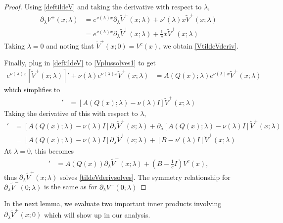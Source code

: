 \documentclass[thesis.tex]{subfiles}
\begin{document}
\begin{lemma}
\begin{proof}
Using \cref{deftildeV} and taking the derivative with respect to $\lambda$,
\begin{align*}
\partial_\lambda V^+(x; \lambda)
&= e^{\nu(\lambda)x} \partial_\lambda \tilde{V}^+(x; \lambda) + \nu'(\lambda)x \tilde{V}^+(x; \lambda) \\
&= e^{\nu(\lambda)x} \partial_\lambda \tilde{V}^+(x; \lambda) + \frac{1}{c} x \tilde{V}^+(x; \lambda) 
\end{align*}
Taking $\lambda = 0$ and noting that $\tilde{V}^+(x; 0) = V^c(x)$, we obtain \cref{VtildeVderiv}.

Finally, plug in \cref{deftildeV} to \cref{Vplussolves1} to get
\begin{align*}
e^{\nu(\lambda)x} [\tilde{V}^+(x; \lambda)]' + \nu(\lambda) e^{\nu(\lambda)x} \tilde{V}^+(x; \lambda) &= 
A(Q(x); \lambda) e^{\nu(\lambda)x} \tilde{V}^+(x; \lambda)
\end{align*}
which simplifies to
\begin{align*}
[\tilde{V}^+(x; \lambda)]' &= 
[A(Q(x); \lambda) - \nu(\lambda) I ] \tilde{V}^+(x; \lambda)
\end{align*}
Taking the derivative of this with respect to $\lambda$,
\begin{align*}
[\partial_\lambda \tilde{V}^+(x; \lambda)]' &= 
[A(Q(x); \lambda) - \nu(\lambda) I ] \partial_\lambda \tilde{V}^+(x; \lambda) + \partial_\lambda [A(Q(x); \lambda) - \nu(\lambda) I ]\tilde{V}^+(x; \lambda) \\
&= [A(Q(x); \lambda) - \nu(\lambda) I ] \partial_\lambda \tilde{V}^+(x; \lambda) + [B - \nu'(\lambda)I]\tilde{V}^+(x; \lambda) 
\end{align*}
At $\lambda = 0$, this becomes
\begin{align*}
[\partial_\lambda \tilde{V}^+(0; \lambda)]' &= A(Q(x))\partial_\lambda \tilde{V}^+(x; \lambda) + \left( B - \frac{1}{c}I\right) V^c(x),
\end{align*}
thus $\partial_\lambda \tilde{V}^+(x; \lambda)$ solves \cref{tildeVderivsolves}. The symmetry relationship for $\partial_\lambda \tilde{V}^-(0; \lambda)$ is the same as for $\partial_\lambda V^-(0; \lambda)$
\end{proof}
\end{lemma}

In the next lemma, we evaluate two important inner products involving $\partial_\lambda \tilde{V}^+(x; 0)$ which will show up in our analysis.
\end{document}
